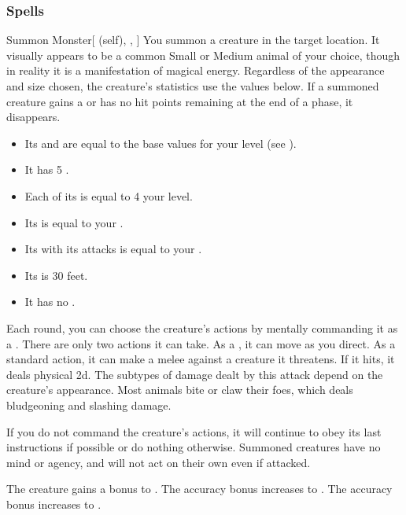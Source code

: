 \subsubsection{Spells}


\lowercase{\hypertarget{spell:Summon Monster}{}}\label{spell:Summon Monster}
\begin{attuneability}[Rank 1]{\hypertarget{spell:Summon Monster}{Summon Monster}}[ (self), , ]
You summon a creature in the target location.
It visually appears to be a common Small or Medium animal of your choice, though in reality it is a manifestation of magical energy.
Regardless of the appearance and size chosen, the creature's statistics use the values below.
If a summoned creature gains a  or has no hit points remaining at the end of a phase, it disappears.

\begin{itemize}
\item Its  and  are equal to the base values for your level (see ).
\item It has 5 .
\item Each of its  is equal to 4 \add your level.
\item Its  is equal to your  .
\item Its  with its attacks is equal to your .
\item Its  is 30 feet.
\item It has no .
\end{itemize}

Each round, you can choose the creature's actions by mentally commanding it as a .
There are only two actions it can take.
As a , it can move as you direct.
As a standard action, it can make a melee  against a creature it threatens.
If it hits, it deals physical  \minus2d.
The subtypes of damage dealt by this attack depend on the creature's appearance.
Most animals bite or claw their foes, which deals bludgeoning and slashing damage.

If you do not command the creature's actions, it will continue to obey its last instructions if possible or do nothing otherwise.
Summoned creatures have no mind or agency, and will not act on their own even if attacked.

\rankline
{} The creature gains a  bonus to .
 The accuracy bonus increases to .
 The accuracy bonus increases to .
\end{attuneability}
\vspace{0.25em}



